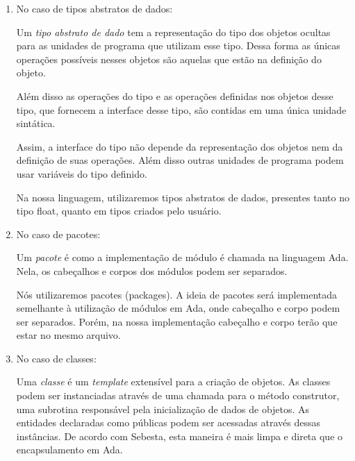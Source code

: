 \begin{enumerate}
        \item
        No caso de tipos abstratos de dados:

        Um \emph{tipo abstrato de dado} tem a representação do tipo dos objetos
        ocultas para as unidades de programa que utilizam esse tipo. Dessa forma as
        únicas operações possíveis nesses objetos são aquelas que estão na
        definição do objeto.

        Além disso as operações do tipo e as operações definidas nos objetos
        desse tipo, que fornecem a interface desse tipo, são contidas em uma
        única unidade sintática.

        Assim,  a interface do tipo não depende da representação dos objetos
        nem da definição de suas operações. Além disso outras unidades de
        programa podem usar variáveis do tipo definido.

        Na nossa linguagem, utilizaremos tipos abstratos de dados, presentes
        tanto no tipo float, quanto em tipos criados pelo usuário.


        \item No caso de pacotes:

        Um \emph{pacote} é como a implementação de módulo é chamada na
        linguagem Ada. Nela, os cabeçalhos e corpos dos módulos podem ser
        separados.

        Nós utilizaremos pacotes (packages). A ideia de pacotes será
        implementada semelhante à utilização de módulos em Ada, onde cabeçalho
        e corpo podem ser separados. Porém, na nossa implementação cabeçalho e
        corpo terão que estar no mesmo arquivo.

        \item
        No caso de classes:

        Uma \emph{classe} é um \emph{template} extensível para a criação de
        objetos. As classes podem ser instanciadas através de uma chamada para
        o método construtor, uma subrotina responsável pela inicialização de
        dados de objetos. As entidades declaradas como públicas podem ser
        acessadas através dessas instâncias. De acordo com Sebesta, esta
        maneira é mais limpa e direta que o encapsulamento em Ada.


\end{enumerate}
